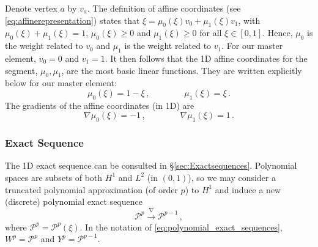 Denote vertex $a$ by $v_a$.
The definition of affine coordinates (see \eqref{eq:affinerepresentation}) states that $\xi=\mu_0(\xi)v_0+\mu_1(\xi)v_1$, with $\mu_0(\xi)+\mu_1(\xi)=1$, $\mu_0(\xi)\geq0$ and $\mu_1(\xi)\geq0$ for all $\xi\in[0,1]$.
Hence, $\mu_0$ is the weight related to $v_0$ and $\mu_1$ is the weight related to $v_1$.
For our master element, $v_0=0$ and $v_1=1$.
It then follows that the 1D affine coordinates for the segment, $\mu_0,\mu_1$, are the most basic linear functions.
They are written explicitly below for our master element:
\begin{equation}
		\mu_0(\xi) = 1 - \xi\,,\qquad\qquad \mu_1(\xi) = \xi \,.\label{eq:H1_1DAffine}
\end{equation}
The gradients of the affine coordinates (in 1D) are
\begin{equation}
		\nabla\mu_0(\xi)=-1\,,\qquad\qquad\nabla\mu_1(\xi)=1\,.\label{eq:gradH1_1DAffine}
\end{equation}


\subsubsection*{Exact Sequence}
The 1D exact sequence can be consulted in \S\ref{sec:Exactsequences}. 
Polynomial spaces are subsets of both $H^1$ and $L^2$ (in $(0,1)$), so we may consider a truncated polynomial approximation (of order $p$) to $H^1$ and induce a new (discrete) polynomial exact sequence
\begin{equation}
	\mathcal{P}^p \xrightarrow{\nabla} \mathcal{P}^{p-1}\,,\label{eq:ESsegment}
\end{equation}
where $\mathcal{P}^p=\mathcal{P}^p(\xi)$.
In the notation of \eqref{eq:polynomial_exact_sequences}, $W^p=\mathcal{P}^p$ and $Y^p=\mathcal{P}^{p-1}$.

